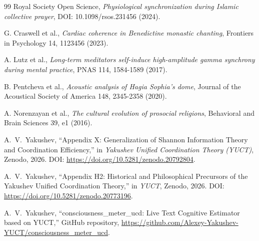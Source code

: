 \documentclass[12pt,a4paper]{article}
\begin{document}
\begin{thebibliography}{99}
		Royal Society Open Science, \emph{Physiological synchronization during Islamic collective prayer}, DOI: 10.1098/rsos.231456 (2024).
		
		G. Craswell et al., \emph{Cardiac coherence in Benedictine monastic chanting}, Frontiers in Psychology 14, 1123456 (2023).
		
		A. Lutz et al., \emph{Long-term meditators self-induce high-amplitude gamma synchrony during mental practice}, PNAS 114, 1584-1589 (2017).
		
		B. Pentcheva et al., \emph{Acoustic analysis of Hagia Sophia's dome}, Journal of the Acoustical Society of America 148, 2345-2358 (2020).
		
		A. Norenzayan et al., \emph{The cultural evolution of prosocial religions}, Behavioral and Brain Sciences 39, e1 (2016).
		
		A.~V.~Yakushev, ``Appendix X: Generalization of Shannon Information Theory and Coordination Efficiency,'' in \emph{Yakushev Unified Coordination Theory (YUCT)}, Zenodo, 2026. DOI: \url{https://doi.org/10.5281/zenodo.20792804}.
		
		A.~V.~Yakushev, ``Appendix H2: Historical and Philosophical Precursors of the Yakushev Unified Coordination Theory,'' in \emph{YUCT}, Zenodo, 2026. DOI: \url{https://doi.org/10.5281/zenodo.20773196}.
		
		A.~V.~Yakushev, ``consciousness\_meter\_ucd: Live Text Cognitive Estimator based on YUCT,'' GitHub repository, \url{https://github.com/Alexey-Yakushev-YUCT/consciousness_meter_ucd}.
		
	\end{thebibliography}
	
\end{document}
